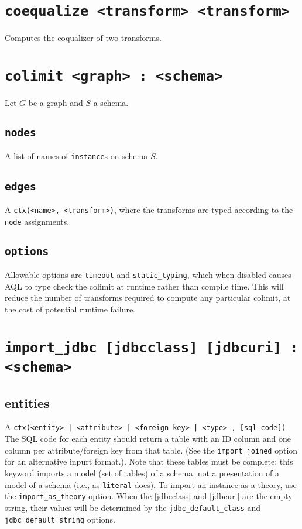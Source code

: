 \documentclass[10pt]{book}
\begin{document}
\section{{\tt coequalize <transform> <transform>}}
Computes the coqualizer of two transforms.


\section{{\tt colimit <graph> : <schema>}}
Let $G$ be a graph and $S$ a schema.

\subsection{{\tt nodes}}
A list of names of {\tt instance}s on schema $S$.

\subsection{{\tt edges}}
A {\tt ctx(<name>, <transform>)}, where the transforms are typed according to the {\tt node} assignments.

\subsection{{\tt options}}
Allowable options are {\tt timeout} and {\tt static\_typing}, which when disabled causes AQL to type check the colimit at runtime rather than compile time.  This will reduce the number of transforms required to compute any particular colimit, at the cost of potential runtime failure.

\section{{\tt import\_jdbc [jdbcclass] [jdbcuri] : <schema>}}

\subsection{entities}
A {\tt ctx(<entity> | <attribute> | <foreign key> | <type> , [sql code])}.  The SQL code for each entity should return a table with an ID column and one column per attribute/foreign key from that table.  (See the {\tt import\_joined} option for an alternative inpurt format.). Note that these tables must be complete: this keyword imports a model (set of tables) of a schema, not a presentation of a model of a schema (i.e., as {\tt literal} does).  To import an instance as a theory, use the {\tt import\_as\_theory} option.  When the [jdbcclass] and [jdbcuri] are the empty string, their values will be determined by the {\tt jdbc\_default\_class} and {\tt jdbc\_default\_string} options. 
\end{document}
